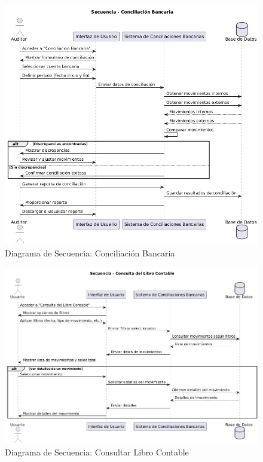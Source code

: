 \documentclass{article}
\begin{document}
\begin{figure}[H]
    \centering
    \includegraphics[width=\textwidth]{secuencia/ConciliacionBancaria.png}
    \caption{Diagrama de Secuencia: Conciliación Bancaria}
\end{figure}

\begin{figure}[H]
    \centering
    \includegraphics[width=\textwidth]{secuencia/ConsultaLibroContable.png}
    \caption{Diagrama de Secuencia: Consultar Libro Contable}
\end{figure}
\end{document}
